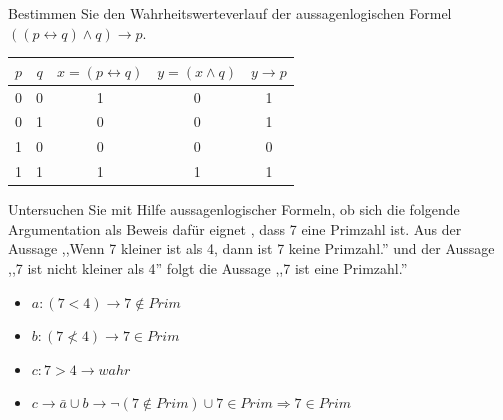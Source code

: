 \documentclass[10pt, a4paper]{exam}
\begin{document}
\begin{questions}

    \question Bestimmen Sie den Wahrheitswerteverlauf der aussagenlogischen Formel $((p \leftrightarrow q) \wedge q) \rightarrow p$.
    \begin{solution}

        \begin{tabular}{c c c c c}
            $p$ & $q$ & $x=(p\leftrightarrow q)$ & $y=(x\wedge q)$ & $y\rightarrow p$ \\\hline
            0   & 0   & 1                        & 0               & 1                \\
            0   & 1   & 0                        & 0               & 1                \\
            1   & 0   & 0                        & 0               & 0                \\
            1   & 1   & 1                        & 1               & 1                \\
        \end{tabular}
    \end{solution}

    \question Untersuchen Sie mit Hilfe aussagenlogischer Formeln, ob sich die folgende Argumentation als Beweis dafür eignet , dass 7 eine Primzahl ist. Aus der Aussage ,,Wenn 7 kleiner ist als 4, dann ist 7 keine Primzahl.'' und der Aussage ,,7 ist nicht kleiner als 4'' folgt die Aussage ,,7 ist eine Primzahl.''
    \begin{solution}
        \begin{itemize}
            \item $a: (7<4)\rightarrow 7\not\in Prim$
            \item $b: (7\not<4)\rightarrow 7\in Prim$
            \item $c: 7>4 \rightarrow wahr$
            \item $c\rightarrow \bar{a} \cup b \rightarrow \lnot(7\not\in Prim) \cup 7\in Prim \Rightarrow 7\in Prim$
        \end{itemize}
    \end{solution}


\end{questions}
\end{document}
